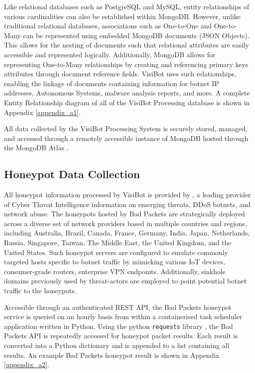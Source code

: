 Like relational databases such as PostgreSQL and MySQL, entity relationships of various cardinalities can also be established within MongoDB. However, unlike traditional relational databases, associations such as One-to-One and One-to-Many can be represented using embedded MongoDB documents (JSON Objects). This allows for the nesting of documents such that relational attributes are easily accessible and represented logically. Additionally, MongoDB allows for representing One-to-Many relationships by creating and referencing primary keys attributes through document reference fields. VisiBot uses such relationships, enabling the linkage of documents containing information for botnet IP addresses, Autonomous Systems, malware analysis reports, and more. A complete Entity Relationship diagram of all of the VisiBot Processing database is shown in Appendix \ref{appendix_a1}.

All data collected by the VisiBot Processing System is securely stored, managed, and accessed through a remotely accessible instance of MongoDB hosted through the MongoDB Atlas \citep{MongoDBAtlas}.

\subsection{Honeypot Data Collection}

All honeypot information processed by VisiBot is provided by \citet{BadPackets}, a leading provider of Cyber Threat Intelligence information on emerging threats, DDoS botnets, and network abuse. The honeypots hosted by Bad Packets are strategically deployed across a diverse set of network providers based in multiple countries and regions, including Australia, Brazil, Canada, France, Germany, India, Japan, Netherlands, Russia, Singapore, Taiwan, The Middle East, the United Kingdom, and the United States. Such honeypot servers are configured to emulate commonly targeted hosts specific to botnet traffic by mimicking various IoT devices, consumer-grade routers, enterprise VPN endpoints. Additionally, sinkhole domains previously used by threat-actors are employed to point potential botnet traffic to the honeypots.

Accessible through an authenticated REST API, the Bad Packets honeypot service is queried on an hourly basis from within a containerised task scheduler application written in Python. Using the python \texttt{requests} library \citep{PythonRequests}, the Bad Packets API is repeatedly accessed for honeypot packet results. Each result is converted into a Python dictionary and is appended to a list containing all results. An example Bad Packets honeypot result is shown in Appendix \ref{appendix_a2}.

